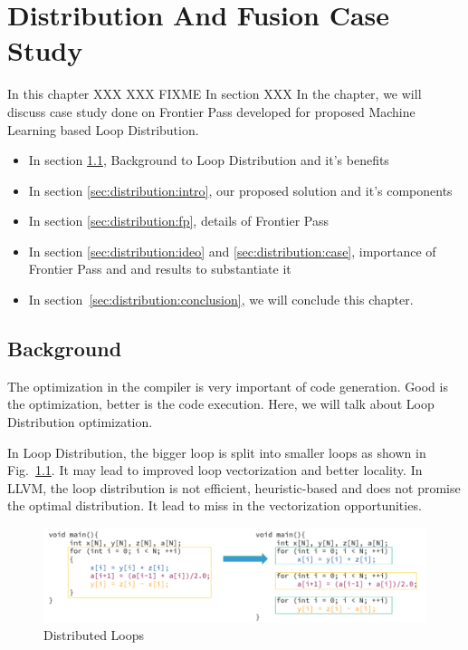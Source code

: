 \chapter{Distribution And Fusion Case Study}
\label{chap:ch4}

In this chapter XXX XXX FIXME In section XXX
In the chapter, we will discuss case study done on Frontier Pass developed for proposed Machine Learning based Loop Distribution.
\begin{itemize}
    
    \item In section \ref{sec:distribution:bg}, Background to Loop Distribution and it's benefits
    
    \item In section \ref{sec:distribution:intro}, our proposed solution and it's components
    
    \item In section \ref{sec:distribution:fp}, details of Frontier Pass 
    
    \item In section \ref{sec:distribution:ideo} and \ref{sec:distribution:case}, importance of  Frontier Pass and and results to substantiate it 
    
    \item  In section~\ref{sec:distribution:conclusion}, we will conclude this chapter.

\end{itemize}


\section{Background}\label{sec:distribution:bg}
    The optimization in the compiler is very important of code generation.
Good is the optimization, better is the code execution. Here, we will talk about Loop Distribution optimization.

    In Loop Distribution, the bigger loop is split into smaller loops as shown in Fig.~\ref{fig:dist-introduction}. It may lead to improved loop vectorization and better locality. In LLVM, the loop distribution is not efficient, heuristic-based and does not promise the optimal distribution. It lead to miss in the vectorization opportunities.

\begin{figure}[t]
    \centering
    \includegraphics[scale=0.45]{figures/chapter-4/distribution_introduction.png}
    \caption{Distributed Loops}
     \label{fig:dist-introduction}
\end{figure}

